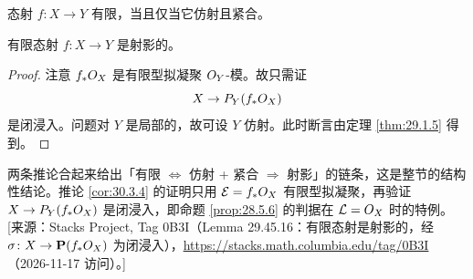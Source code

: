 \begin{corollary}\label{cor:30.3.3}
态射 $f\colon X\to Y$ 有限，当且仅当它仿射且紧合。
\end{corollary}

\begin{corollary}\label{cor:30.3.4}
有限态射 $f\colon X\to Y$ 是射影的。
\end{corollary}


\begin{proof}
注意 $f_*O_X$ 是有限型拟凝聚 $O_Y$-模。故只需证
\[
X\to P_Y(f_*O_X)
\]
是闭浸入。问题对 $Y$ 是局部的，故可设 $Y$ 仿射。此时断言由定理 \ref{thm:29.1.5} 得到。
\end{proof}

\begin{yizhu}
两条推论合起来给出「有限 $\Leftrightarrow$ 仿射 + 紧合 $\Rightarrow$ 射影」的链条，这是整节的结构性结论。推论 \ref{cor:30.3.4} 的证明只用 $\mathcal{E}=f_*O_X$ 有限型拟凝聚，再验证 $X\to P_Y(f_*O_X)$ 是闭浸入，即命题 \ref{prop:28.5.6} 的判据在 $\mathcal{L}=O_X$ 时的特例。
[来源：Stacks Project, Tag 0B3I（Lemma 29.45.16：有限态射是射影的，经 $\sigma\colon X\to\mathbf P(f_*O_X)$ 为闭浸入），\url{https://stacks.math.columbia.edu/tag/0B3I}（2026-11-17 访问）。]
\end{yizhu}
